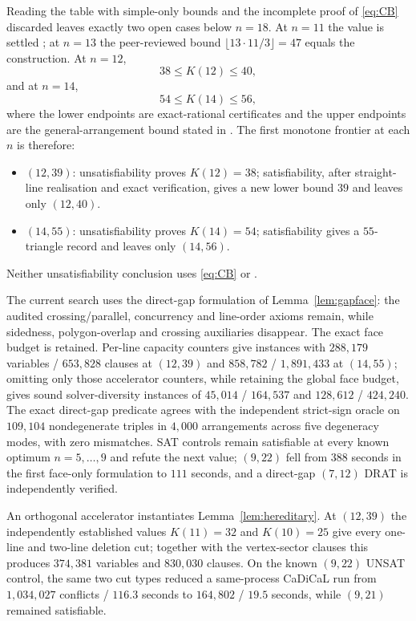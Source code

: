 \documentclass[11pt]{article}
\theoremstyle{definition}
\begin{document}
Reading the table with simple-only bounds and the incomplete proof of
\eqref{eq:CB} discarded leaves exactly two open cases below $n=18$. At
$n=11$ the value is settled \cite{Savchuk}; at $n=13$ the peer-reviewed
bound $\lfloor13\cdot11/3\rfloor=47$ equals the construction. At $n=12$,
\[
 38\le K(12)\le40,
\]
and at $n=14$,
\[
 54\le K(14)\le56,
\]
where the lower endpoints are exact-rational certificates and the upper
endpoints are the general-arrangement bound stated in \cite{FK1999}. The
first monotone frontier at each $n$ is therefore:
\begin{itemize}
\item $(12,39)$: unsatisfiability proves $K(12)=38$; satisfiability, after
straight-line realisation and exact verification, gives a new lower bound
$39$ and leaves only $(12,40)$.
\item $(14,55)$: unsatisfiability proves $K(14)=54$; satisfiability gives a
$55$-triangle record and leaves only $(14,56)$.
\end{itemize}
Neither unsatisfiability conclusion uses \eqref{eq:CB} or \cite{FK1999}.

The current search uses the direct-gap formulation of
Lemma~\ref{lem:gapface}: the audited crossing/parallel, concurrency and
line-order axioms remain, while sidedness, polygon-overlap and crossing
auxiliaries disappear. The exact face budget is retained. Per-line capacity
counters give instances with $288{,}179$ variables / $653{,}828$ clauses at
$(12,39)$ and $858{,}782$ / $1{,}891{,}433$ at $(14,55)$; omitting only
those accelerator counters, while retaining the global face budget, gives
sound solver-diversity instances of $45{,}014$ / $164{,}537$ and
$128{,}612$ / $424{,}240$. The exact direct-gap predicate agrees with the
independent strict-sign oracle on $109{,}104$ nondegenerate triples in
$4{,}000$ arrangements across five degeneracy modes, with zero mismatches.
SAT controls remain satisfiable at every known optimum $n=5,\dots,9$ and
refute the next value; $(9,22)$ fell from $388$ seconds in the first
face-only formulation to $111$ seconds, and a direct-gap $(7,12)$ DRAT is
independently verified.

An orthogonal accelerator instantiates Lemma~\ref{lem:hereditary}. At
$(12,39)$ the independently established values $K(11)=32$ and $K(10)=25$
give every one-line and two-line deletion cut; together with the vertex-sector
clauses this produces $374{,}381$ variables and $830{,}030$ clauses. On the
known $(9,22)$ UNSAT control, the same two cut types reduced a same-process
CaDiCaL run from $1{,}034{,}027$ conflicts / $116.3$ seconds to $164{,}802$ /
$19.5$ seconds, while $(9,21)$ remained satisfiable.
\end{document}
